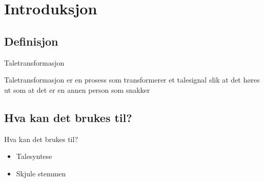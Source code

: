 
\section{Introduksjon}

\subsection{Definisjon}

\begin{frame}{Taletransformasjon}
\begin{defn}
	Taletransformasjon er en prosess som transformerer et talesignal slik at det høres ut som at det er en annen person som snakker
\end{defn}
\end{frame}




\subsection[Bruksområde]{Hva kan det brukes til?}
\begin{frame}{Hva kan det brukes til?}
	\begin{itemize}
		\item Talesyntese
	\pause 	\item Skjule stemmen
	\end{itemize}
\end{frame}


